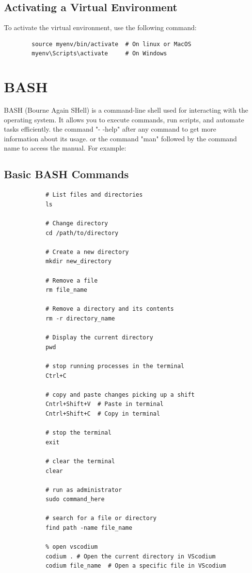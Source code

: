 \documentclass[a4paper,11pt]{article}
\begin{document}
        \subsection{Activating a Virtual Environment}
        To activate the virtual environment, use the following command:
        \begin{verbatim}
        source myenv/bin/activate  # On linux or MacOS
        myenv\Scripts\activate     # On Windows
        \end{verbatim}        
        


    \section{BASH}

        BASH (Bourne Again SHell) is a command-line shell used for interacting with the operating system.
        It allows you to execute commands, run scripts, and automate tasks efficiently.
        the command "- -help" after any command to get more information about its usage. 
        or the command "man" followed by the command name to access the manual. For example:
 
        \subsection{Basic BASH Commands}

            \begin{verbatim}
            # List files and directories
            ls

            # Change directory
            cd /path/to/directory

            # Create a new directory
            mkdir new_directory

            # Remove a file
            rm file_name

            # Remove a directory and its contents
            rm -r directory_name

            # Display the current directory
            pwd

            # stop running processes in the terminal
            Ctrl+C

            # copy and paste changes picking up a shift
            Cntrl+Shift+V  # Paste in terminal
            Cntrl+Shift+C  # Copy in terminal

            # stop the terminal
            exit

            # clear the terminal
            clear

            # run as administrator
            sudo command_here

            # search for a file or directory
            find path -name file_name

            % open vscodium 
            codium . # Open the current directory in VScodium
            codium file_name  # Open a specific file in VScodium
            \end{verbatim}
        
\end{document}
